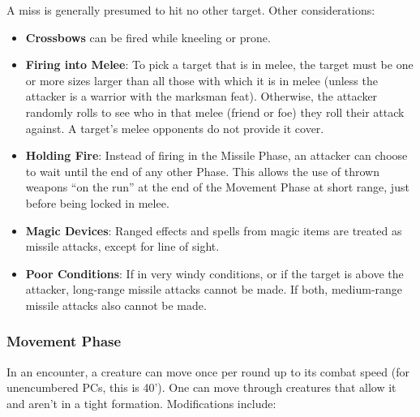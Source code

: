 \documentclass{article}
\begin{document}
\begin{multicols}{2}
A miss is generally presumed to hit no other target. Other
considerations:

\begin{itemize}
\tightlist
\item
  \textbf{Crossbows} can be fired while kneeling or prone.
\item
  \textbf{Firing into Melee}: To pick a target that is in melee, the
  target must be one or more sizes larger than all those with which it
  is in melee (unless the attacker is a warrior with the marksman feat).
  Otherwise, the attacker randomly rolls to see who in that melee
  (friend or foe) they roll their attack against. A target's melee
  opponents do not provide it cover.
\item
  \textbf{Holding Fire}: Instead of firing in the Missile Phase, an
  attacker can choose to wait until the end of any other Phase. This
  allows the use of thrown weapons ``on the run'' at the end of the
  Movement Phase at short range, just before being locked in melee.
\item
  \textbf{Magic Devices}: Ranged effects and spells from magic items are
  treated as missile attacks, except for line of sight.
\item
  \textbf{Poor Conditions}: If in very windy conditions, or if the
  target is above the attacker, long-range missile attacks cannot be
  made. If both, medium-range missile attacks also cannot be made.
\end{itemize}

\subsubsection{Movement Phase}\label{movement-phase}

In an encounter, a creature can move once per round up to its combat
speed (for unencumbered PCs, this is 40'). One can move through
creatures that allow it and aren't in a tight formation. Modifications
include:


\end{multicols}
\end{document}

